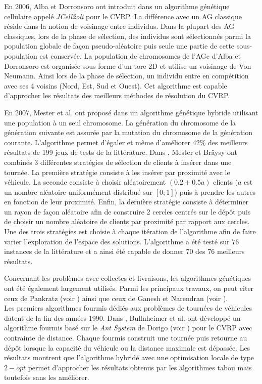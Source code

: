 En 2006, Alba et Dorronsoro ont introduit dans \cite{Alba2006} un algorithme génétique cellulaire appelé \textit{JCell2oli} pour le CVRP. La différence avec un AG classique réside dans la notion de voisinage entre individus. Dans la plupart des AG classiques, lors de la phase de sélection, des individus sont sélectionnés parmi la population globale de façon pseudo-aléatoire puis seule une partie de cette sous-population est conservée. La population de chromosomes de l'AGc d'Alba et Dorronsoro est organisée sous forme d'un tore 2D et utilise un voisinage de Von Neumann. Ainsi lors de la phase de sélection, un individu entre en compétition avec ses 4 voisins (Nord, Est, Sud et Ouest). Cet algorithme est capable d'approcher les résultats des meilleurs méthodes de résolution du CVRP.

En 2007, Mester et al. ont proposé dans \cite{Mester2007} un algorithme génétique hybride utilisant une population à un seul chromosome. La génération du chromosome de la génération suivante est assurée par la mutation du chromosome de la génération courante. L'algorithme permet d'égaler et même d'améliorer 42\% des meilleurs résultats de 199 jeux de tests de la littérature.
Dans \cite{Mester2007b}, Mester et Bräysy ont combinés 3 différentes stratégies de sélection de clients à insérer dans une tournée. La première stratégie consiste à les insérer par proximité avec le véhicule. La seconde consiste à choisir aléatoirement $(0.2 + 0.5a)$ clients ($a$ est un nombre aléatoire uniformément distribué sur $[0;1]$) puis à prendre les autres en fonction de leur proximité. Enfin, la dernière stratégie consiste à déterminer un rayon de façon aléatoire afin de construire 2 cercles centrés sur le dépôt puis de choisir un nombre aléatoire de clients par proximité par rapport aux cercles. Une des trois stratégies est choisie à chaque itération de l'algorithme afin de faire varier l'exploration de l'espace des solutions. L'algorithme a été testé sur 76 instances de la littérature et a ainsi été capable de donner 70 des 76 meilleurs résultats.

Concernant les problèmes avec collectes et livraisons, les algorithmes génétiques ont été également largement utilisés. Parmi les principaux travaux, on peut citer ceux de Pankratz (voir \cite{Pankratz2005b}) ainsi que ceux de Ganesh et Narendran (voir \cite{Ganesh2007}).\\


Les premiers algorithmes fourmis dédiés aux problèmes de tournées de véhicules datent de la fin des années 1990. Dans \cite{Bullnheimer1997b,Bullnheimer1997c}, Bullnheimer et al. ont développé un algorithme fourmis basé sur le \textit{Ant System} de Dorigo (voir \cite{Dorigo1992}) pour le CVRP avec contrainte de distance. Chaque fourmis construit une tournée puis retourne au dépôt lorsque la capacité du véhicule ou la distance maximale est dépassée. Les résultats montrent que l'algorithme hybridé avec une optimisation locale de type $2-opt$ permet d'approcher les résultats obtenus par les algorithmes tabou mais toutefois sans les améliorer.

